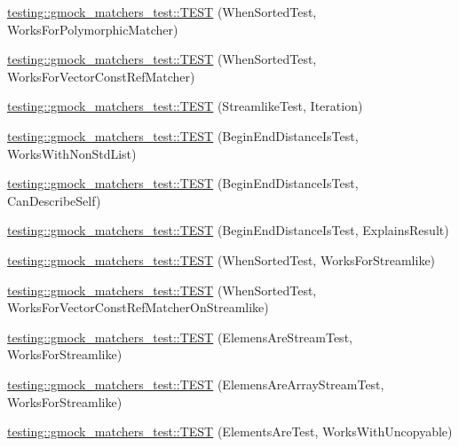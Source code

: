 \begin{DoxyCompactItemize}
\item 
\hyperlink{namespacetesting_1_1gmock__matchers__test_a587c3799433426782ccdcfe5cb07f5bc}{testing\+::gmock\+\_\+matchers\+\_\+test\+::\+T\+E\+ST} (When\+Sorted\+Test, Works\+For\+Polymorphic\+Matcher)
\item 
\hyperlink{namespacetesting_1_1gmock__matchers__test_a0975bae51ce06a819dc1437134fd7f05}{testing\+::gmock\+\_\+matchers\+\_\+test\+::\+T\+E\+ST} (When\+Sorted\+Test, Works\+For\+Vector\+Const\+Ref\+Matcher)
\item 
\hyperlink{namespacetesting_1_1gmock__matchers__test_a5aa4eed927d4a1a8ea306d5e47dce94f}{testing\+::gmock\+\_\+matchers\+\_\+test\+::\+T\+E\+ST} (Streamlike\+Test, Iteration)
\item 
\hyperlink{namespacetesting_1_1gmock__matchers__test_add74820690e798ae8a365d08b68ddf71}{testing\+::gmock\+\_\+matchers\+\_\+test\+::\+T\+E\+ST} (Begin\+End\+Distance\+Is\+Test, Works\+With\+Non\+Std\+List)
\item 
\hyperlink{namespacetesting_1_1gmock__matchers__test_aa4ef2a94a7d75aa6116e8537deaa5f56}{testing\+::gmock\+\_\+matchers\+\_\+test\+::\+T\+E\+ST} (Begin\+End\+Distance\+Is\+Test, Can\+Describe\+Self)
\item 
\hyperlink{namespacetesting_1_1gmock__matchers__test_a89445da783c74dfa09c9c09531646f5b}{testing\+::gmock\+\_\+matchers\+\_\+test\+::\+T\+E\+ST} (Begin\+End\+Distance\+Is\+Test, Explains\+Result)
\item 
\hyperlink{namespacetesting_1_1gmock__matchers__test_a8de8e3760418cfcd33913cd30f16d117}{testing\+::gmock\+\_\+matchers\+\_\+test\+::\+T\+E\+ST} (When\+Sorted\+Test, Works\+For\+Streamlike)
\item 
\hyperlink{namespacetesting_1_1gmock__matchers__test_aa6bfe7b6cc288d93f60b9f52e095b233}{testing\+::gmock\+\_\+matchers\+\_\+test\+::\+T\+E\+ST} (When\+Sorted\+Test, Works\+For\+Vector\+Const\+Ref\+Matcher\+On\+Streamlike)
\item 
\hyperlink{namespacetesting_1_1gmock__matchers__test_adb0f512a2369d69f056e42e1cc5f3fc2}{testing\+::gmock\+\_\+matchers\+\_\+test\+::\+T\+E\+ST} (Elemens\+Are\+Stream\+Test, Works\+For\+Streamlike)
\item 
\hyperlink{namespacetesting_1_1gmock__matchers__test_a5cc317a80c3501cb7f53d07043b7270c}{testing\+::gmock\+\_\+matchers\+\_\+test\+::\+T\+E\+ST} (Elemens\+Are\+Array\+Stream\+Test, Works\+For\+Streamlike)
\item 
\hyperlink{namespacetesting_1_1gmock__matchers__test_ab403dce87c2d198a4f709d7f781d03c6}{testing\+::gmock\+\_\+matchers\+\_\+test\+::\+T\+E\+ST} (Elements\+Are\+Test, Works\+With\+Uncopyable)

\end{DoxyCompactItemize}
